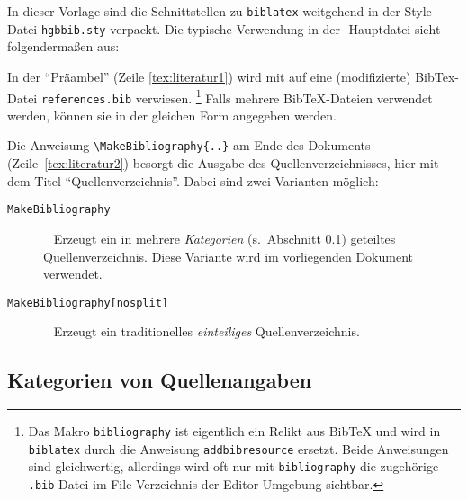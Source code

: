 In dieser Vorlage sind die Schnittstellen zu \texttt{biblatex} weitgehend in der Style-Datei 
\nolinkurl{hgbbib.sty} verpackt. Die typische Verwendung in der \latex-Haupt\-datei sieht 
folgendermaßen aus:
%
%
In der "`Präambel"' (Zeile \ref{tex:literatur1}) wird mit \verb!! 
auf eine (modifizierte) BibTex-Datei \nolinkurl{references.bib} verwiesen.%
\footnote{Das Makro 
\texttt{{\bs}bibliography} ist eigentlich ein Relikt aus BibTeX
und wird in \texttt{biblatex} durch die Anweisung \texttt{{\bs}addbibresource} 
ersetzt. Beide Anweisungen sind gleichwertig, allerdings wird oft nur mit 
\texttt{{\bs}bibliography} die zugehörige \texttt{.bib}-Datei im File-Verzeichnis 
der Editor-Umgebung sichtbar.}
Falls mehrere BibTeX-Dateien verwendet werden, können sie in der gleichen Form angegeben werden.

Die Anweisung \verb!! am Ende des Dokuments (Zeile~\ref{tex:literatur2})
besorgt die Ausgabe des Quellenverzeichnisses, hier mit dem Titel "`Quellenverzeichnis"'.
Dabei sind zwei Varianten möglich:
%
\begin{description}
\item[\texttt{{\bs}MakeBibliography}] ~ \newline
   Erzeugt ein in mehrere \emph{Kategorien} (s.\ Abschnitt \ref{sec:BibKategorien}) geteiltes Quellenverzeichnis. 
	 Diese Variante wird im vorliegenden Dokument verwendet.
\item[\texttt{{\bs}MakeBibliography[nosplit]}] ~ \newline
   Erzeugt ein traditionelles \emph{einteiliges} Quellenverzeichnis. 
\end{description}


\subsection{Kategorien von Quellenangaben}
\label{sec:BibKategorien}

